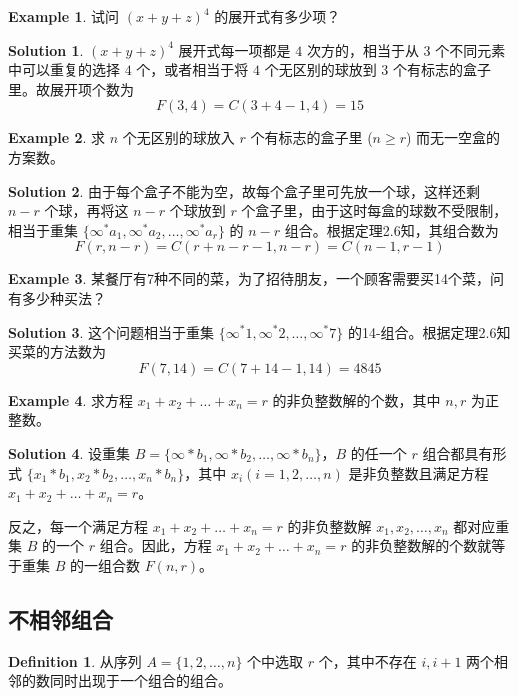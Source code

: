 \documentclass[oneside]{book}
\theoremstyle{definition}
\newtheorem{example}{Example}[section]
\newtheorem{definition}{Definition}[section]
\newtheorem*{sol}{Solution}
\begin{document}
\begin{example}
试问 $(x+y+z)^4$ 的展开式有多少项？
\end{example}
\begin{sol}
	 $(x+y+z)^4$ 展开式每一项都是 $4$ 次方的，相当于从 $3$ 个不同元素中可以重复的选择 $4$ 个，或者相当于将 $4$ 个无区别的球放到 $3$ 个有标志的盒子里。故展开项个数为  
	\[F(3,4)=C(3+4-1,4)=15\]
\end{sol}
\begin{example}
	求 \( n \) 个无区别的球放入 \( r \) 个有标志的盒子里 (\( n \geq r \)) 而无一空盒的方案数。
\end{example}
\begin{sol}
由于每个盒子不能为空，故每个盒子里可先放一个球，这样还剩 \( n-r \) 个球，再将这 \( n-r \) 个球放到 \( r \) 个盒子里，由于这时每盒的球数不受限制，相当于重集 \(\{ \infty^*a_1, \infty^*a_2, \ldots, \infty^*a_r \}\) 的 \( n-r \) 组合。根据定理2.6知，其组合数为
\[F(r,n-r) = C(r+n-r-1,n-r) = C(n-1,r-1)\]
\end{sol}
\begin{example}
	某餐厅有7种不同的菜，为了招待朋友，一个顾客需要买14个菜，问有多少种买法？
\end{example}
\begin{sol}
	这个问题相当于重集 \(\{ \infty^*1, \infty^*2, \ldots, \infty^*7 \}\) 的14-组合。根据定理2.6知买菜的方法数为
\[F(7,14) = C(7+14-1,14) = 4845\]
\end{sol}
\begin{example}
	求方程 \( x_1 + x_2 + \ldots + x_n = r \) 的非负整数解的个数，其中 \( n, r \) 为正整数。
\end{example}
\begin{sol}
	设重集 \( B = \{ \infty * b_1, \infty * b_2, \ldots, \infty * b_n \} \)，\( B \) 的任一个 \( r \) 组合都具有形式 \(\{ x_1 * b_1, x_2 * b_2, \ldots, x_n * b_n \}\)，其中 \( x_i (i=1, 2, \ldots, n) \) 是非负整数且满足方程 \( x_1 + x_2 + \ldots + x_n = r \)。

反之，每一个满足方程 \( x_1 + x_2 + \ldots + x_n = r \) 的非负整数解 \( x_1, x_2, \ldots, x_n \) 都对应重集 \( B \) 的一个 \( r \) 组合。因此，方程 \( x_1 + x_2 + \ldots + x_n = r \) 的非负整数解的个数就等于重集 \( B \) 的一组合数 \( F(n, r) \)。
\end{sol}
\subsection{不相邻组合}
\begin{definition}
	从序列 \( A=\{1,2,\ldots,n\} \) 个中选取 \( r \) 个，其中不存在 \( i,i+1 \) 两个相邻的数同时出现于一个组合的组合。
\end{definition}
\end{document}
